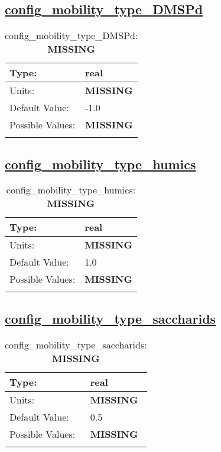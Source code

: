 \subsection[config\_mobility\_type\_DMSPd]{\hyperref[sec:nm_tab_biogeochemistry]{config\_mobility\_type\_DMSPd}}
\label{subsec:nm_sec_config_mobility_type_DMSPd}
\begin{center}
\begin{longtable}{| p{2.0in} || p{4.0in} |}
    \hline
    Type: & real \\
    \hline
    Units: & {\bf \color{red} MISSING} \\
    \hline
    Default Value: & -1.0 \\
    \hline
    Possible Values: & {\bf \color{red} MISSING} \\
    \hline
    \caption{config\_mobility\_type\_DMSPd: {\bf \color{red} MISSING}}
\end{longtable}
\end{center}
\subsection[config\_mobility\_type\_humics]{\hyperref[sec:nm_tab_biogeochemistry]{config\_mobility\_type\_humics}}
\label{subsec:nm_sec_config_mobility_type_humics}
\begin{center}
\begin{longtable}{| p{2.0in} || p{4.0in} |}
    \hline
    Type: & real \\
    \hline
    Units: & {\bf \color{red} MISSING} \\
    \hline
    Default Value: & 1.0 \\
    \hline
    Possible Values: & {\bf \color{red} MISSING} \\
    \hline
    \caption{config\_mobility\_type\_humics: {\bf \color{red} MISSING}}
\end{longtable}
\end{center}
\subsection[config\_mobility\_type\_saccharids]{\hyperref[sec:nm_tab_biogeochemistry]{config\_mobility\_type\_saccharids}}
\label{subsec:nm_sec_config_mobility_type_saccharids}
\begin{center}
\begin{longtable}{| p{2.0in} || p{4.0in} |}
    \hline
    Type: & real \\
    \hline
    Units: & {\bf \color{red} MISSING} \\
    \hline
    Default Value: & 0.5 \\
    \hline
    Possible Values: & {\bf \color{red} MISSING} \\
    \hline
    \caption{config\_mobility\_type\_saccharids: {\bf \color{red} MISSING}}
\end{longtable}
\end{center}
